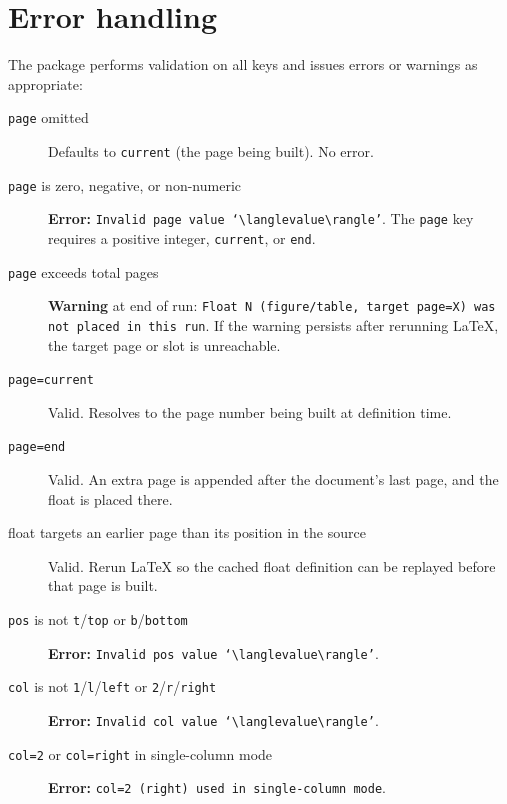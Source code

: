 \documentclass[a4paper]{article}
\newcommand\key[1]{\textcolor{keycolor}{\texttt{#1}}}
\newcommand\meta[1]{\ensuremath{\langle}\textit{#1}\ensuremath{\rangle}}
\begin{document}
\section{Error handling}

The package performs validation on all keys and issues errors or
warnings as appropriate:

\begin{description}
\item[\key{page} omitted] %
  Defaults to \key{current} (the page being built). No error.

\item[\key{page} is zero, negative, or non-numeric] %
  \textbf{Error:} \texttt{Invalid page value `\meta{value}'}.
  The \key{page} key requires a positive integer, \key{current},
  or \key{end}.

\item[\key{page} exceeds total pages] %
  \textbf{Warning} at end of run:
  \texttt{Float N (figure/table, target page=X) was not placed in this run}.
  If the warning persists after rerunning \LaTeX{}, the target page or
  slot is unreachable.

\item[\key{page=current}] %
  Valid. Resolves to the page number being built at definition time.

\item[\key{page=end}] %
  Valid. An extra page is appended after the document's last page,
  and the float is placed there.

\item[float targets an earlier page than its position in the source] %
  Valid. Rerun \LaTeX{} so the cached float definition can be replayed
  before that page is built.

\item[\key{pos} is not \key{t}/\key{top} or \key{b}/\key{bottom}] %
  \textbf{Error:} \texttt{Invalid pos value `\meta{value}'}.

\item[\key{col} is not \key{1}/\key{l}/\key{left} or \key{2}/\key{r}/\key{right}] %
  \textbf{Error:} \texttt{Invalid col value `\meta{value}'}.

\item[\key{col=2} or \key{col=right} in single-column mode] %
  \textbf{Error:} \texttt{col=2 (right) used in single-column mode}.
\end{description}
\end{document}
